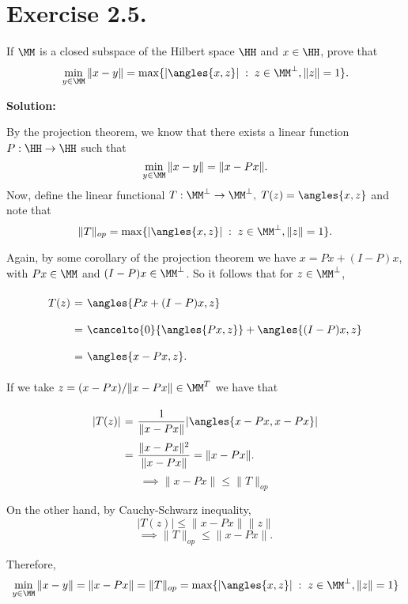 \section*{Exercise 2.5.}

If $\MM$ is a closed subspace of the Hilbert space $\HH$ and $x\in \HH$, prove that
\[ \min_{y\in\MM} \|x-y\| = \max\{|\angles{x,z}| \;:\; z\in \MM^\perp, \|z\| = 1\}. \]

\textbf{Solution:}

By the projection theorem, we know that there exists a linear function $P: \HH \to \HH$ such that
\[ \min_{y\in\MM} \|x-y\| = \|x-Px\|. \]
Now, define the linear functional $T: \MM^{\perp} \to \MM^{\perp},\; T(z) = \angles{x,z}$ and note that
\[ \|T\|_{op} = \max\{|\angles{x,z}| \;:\; z\in \MM^\perp, \|z\| = 1\}. \]

Again, by some corollary of the projection theorem we have $x = Px + (I-P)x$, with $Px \in \MM$ and $(I-P)x \in \MM^{\perp}$. So it follows that for $z \in \MM^\perp$,
\[ \everymath{\displaystyle}
\arraycolsep=1.8pt\def\arraystretch{2}
\begin{array}{rcl}
    T(z) & = & \angles{Px + (I-P)x, z}\\
    & = & \cancelto{0}{\angles{Px, z}} + \angles{(I-P)x, z}\\
    & = & \angles{x-Px, z}.
\end{array} \]

If we take $z = (x-Px)/\|x-Px\| \in \MM^{T}$ we have that
\[ \everymath{\displaystyle}
\arraycolsep=1.8pt\def\arraystretch{2.5}
\begin{array}{rcl}
    |T(z)|  & = & \frac{1}{\|x-Px\|}|\angles{x-Px, x-Px}|\\
    & = & \frac{ \|x-Px\|^2}{\|x-Px\|} = \|x-Px\|.
\end{array}\]
\[ \implies \|x-Px\| \leq \|T\|_{op}  \]

On the other hand, by Cauchy-Schwarz inequality,
\[ |T(z)| \leq \|x-Px\| \|z\| \]
\[ \implies \|T\|_{op} \leq \|x-Px\|. \]

Therefore,
\[ \min_{y\in\MM} \|x-y\| = \|x-Px\| = \|T\|_{op} = \max\{|\angles{x,z}| \;:\; z\in \MM^\perp, \|z\| = 1\} \]
